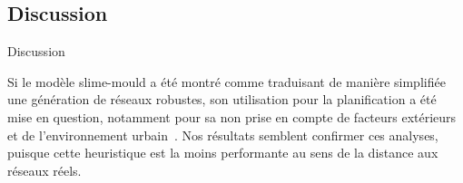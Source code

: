
%
%
%
%


\subsection{Discussion}{Discussion}



Si le modèle slime-mould a été montré comme traduisant de manière simplifiée une génération de réseaux robustes, son utilisation pour la planification a été mise en question, notamment pour sa non prise en compte de facteurs extérieurs et de l'environnement urbain~\cite{adamatzky2010road}. Nos résultats semblent confirmer ces analyses, puisque cette heuristique est la moins performante au sens de la distance aux réseaux réels.










